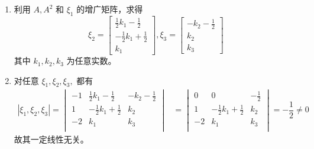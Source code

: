\begin{answer}[2009T22]{}
    \begin{enumerate}[label=(\Roman*)]
        \item 利用 $ A,A^2 $ 和 $ \xi_1 $ 的增广矩阵，求得
        $$
            \xi_2 = \begin{bmatrix}
                \frac{1}{2}k_1 - \frac{1}{2}\\
                -\frac{1}{2}k_1 + \frac{1}{2}\\
                k_1
            \end{bmatrix},
            \xi_3 = \begin{bmatrix}
                -k_2-\frac{1}{2}\\k_2\\k_3
            \end{bmatrix}
        $$
        其中 $ k_1,k_2,k_3 $ 为任意实数。
        \item 对任意 $ \xi_1,\xi_2,\xi_3, $ 都有
        \begin{equation*}
            \begin{aligned}
                |\xi_1,\xi_2,\xi_3| = \begin{vmatrix}
                    -1&\frac{1}{2}k_1 - \frac{1}{2}&-k_2-\frac{1}{2}\\
                    1&-\frac{1}{2}k_1 + \frac{1}{2}&k_2\\
                    -2&k_1&k_3\\
                \end{vmatrix}
                &= \begin{vmatrix}
                    0&0&-\frac{1}{2}\\
                    1&-\frac{1}{2}k_1 + \frac{1}{2}&k_2\\
                    -2&k_1&k_3\\
                \end{vmatrix} = -\dfrac{1}{2}\neq 0
            \end{aligned}
        \end{equation*}
        故其一定线性无关。
    \end{enumerate}
\end{answer}

